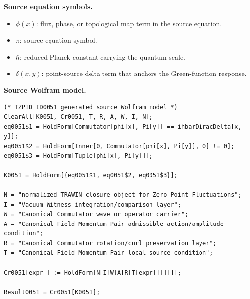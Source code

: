 \begin{minipage}[t]{0.49\linewidth}
\begingroup
\small
\raggedright
\textbf{Source equation symbols.}\par
\begin{itemize}[leftmargin=1.35em,itemsep=1pt,topsep=1pt,parsep=0pt]
    \item $\phi(x)$: flux, phase, or topological map term in the source equation.
    \item $\pi$: source equation symbol.
    \item $\hbar$: reduced Planck constant carrying the quantum scale.
    \item $\delta(x,y)$: point-source delta term that anchors the Green-function response.
\end{itemize}
\endgroup
\end{minipage}\hfill
\begin{minipage}[t]{0.47\linewidth}
\begingroup
\scriptsize
\raggedright
\textbf{Source Wolfram model.}\par
\begin{Verbatim}[fontsize=\tiny,breaklines=true,breakanywhere=true]
(* TZPID ID0051 generated source Wolfram model *)
ClearAll[K0051, Cr0051, T, R, A, W, I, N];
eq0051$1 = HoldForm[Commutator[phi[x], Pi[y]] == ihbarDiracDelta[x, y]];
eq0051$2 = HoldForm[Inner[0, Commutator[phi[x], Pi[y]], 0] != 0];
eq0051$3 = HoldForm[Tuple[phi[x], Pi[y]]];

K0051 = HoldForm[{eq0051$1, eq0051$2, eq0051$3}];

N = "normalized TRAWIN closure object for Zero-Point Fluctuations";
I = "Vacuum Witness integration/comparison layer";
W = "Canonical Commutator wave or operator carrier";
A = "Canonical Field-Momentum Pair admissible action/amplitude condition";
R = "Canonical Commutator rotation/curl preservation layer";
T = "Canonical Field-Momentum Pair local source condition";

Cr0051[expr_] := HoldForm[N[I[W[A[R[T[expr]]]]]]];

Result0051 = Cr0051[K0051];
\end{Verbatim}
\endgroup
\end{minipage}

